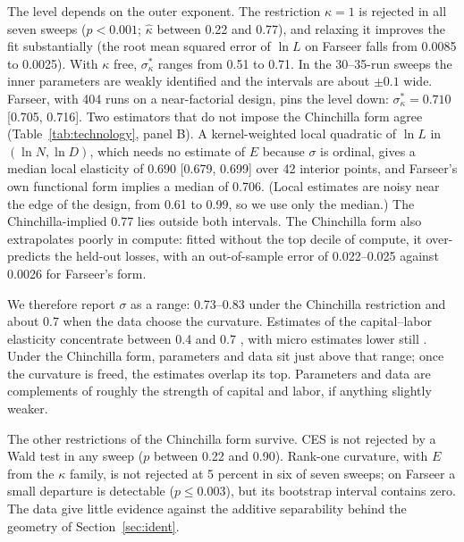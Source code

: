 The level depends on the outer exponent. The restriction $\kappa=1$ is rejected in all seven sweeps ($p<0.001$;
$\hat\kappa$ between 0.22 and 0.77), and relaxing it improves the fit substantially (the root mean squared error of
$\ln L$ on Farseer falls from 0.0085 to 0.0025). With $\kappa$ free, $\sigma^*_\kappa$ ranges from 0.51 to 0.71. In
the 30--35-run sweeps the inner parameters are weakly identified and the intervals are about $\pm0.1$ wide. Farseer,
with 404 runs on a near-factorial design, pins the level down: $\sigma^*_\kappa=0.710$ [0.705, 0.716]. Two estimators
that do not impose the Chinchilla form agree (Table~\ref{tab:technology}, panel B). A kernel-weighted local quadratic of $\ln L$ in
$(\ln N,\ln D)$, which needs no estimate of $E$ because $\sigma$ is ordinal, gives a median local elasticity of 0.690
[0.679, 0.699] over 42 interior points, and Farseer's own functional form implies a median of 0.706. (Local estimates
are noisy near the edge of the design, from 0.61 to 0.99, so we use only the median.) The Chinchilla-implied 0.77
lies outside both intervals. The Chinchilla form also extrapolates poorly in compute: fitted without the top decile of
compute, it over-predicts the held-out losses, with an out-of-sample error of 0.022--0.025 against 0.0026 for
Farseer's form.

We therefore report $\sigma$ as a range: 0.73--0.83 under the Chinchilla restriction and about 0.7 when the data
choose the curvature. Estimates of the capital--labor elasticity concentrate between 0.4 and 0.7
\citep{chirinko2008sigma,klump2007factor,oberfield2021micro}, with micro estimates lower still
\citep{raval2019micro}. Under the Chinchilla form, parameters and data sit just above that range; once the curvature
is freed, the estimates overlap its top. Parameters and data are complements of roughly the strength of capital and
labor, if anything slightly weaker.

The other restrictions of the Chinchilla form survive. CES is not rejected by a Wald test in any sweep ($p$ between
0.22 and 0.90). Rank-one curvature, with $E$ from the $\kappa$ family, is not rejected at 5 percent in six of seven
sweeps; on Farseer a small departure is detectable ($p\le0.003$), but its bootstrap interval contains zero. The data
give little evidence against the additive separability behind the geometry of Section~\ref{sec:ident}.

